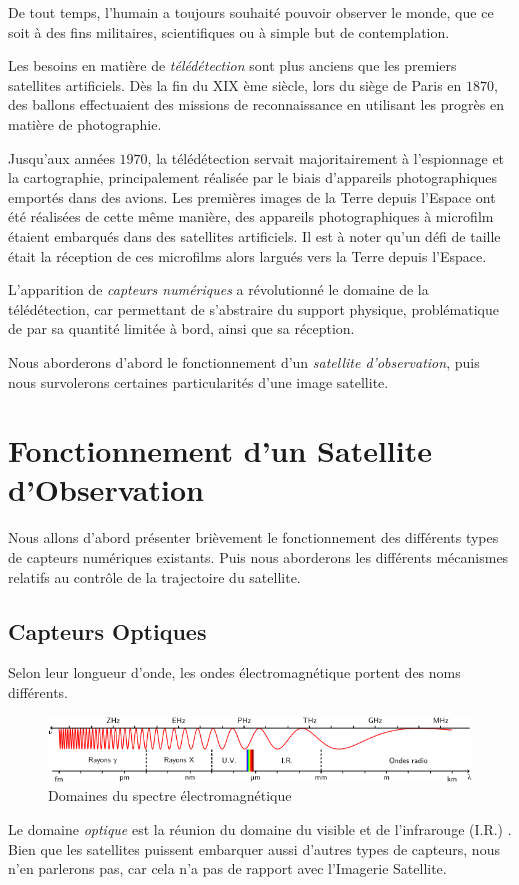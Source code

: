\documentclass[a4paper, 11pt]{report}
\begin{document}
De tout temps, l'humain a toujours souhaité pouvoir observer le monde, que ce soit à des fins militaires, scientifiques ou à simple but de contemplation.

Les besoins en matière de \emph{télédétection} sont plus anciens que les premiers satellites artificiels. Dès la fin du XIX ème siècle, lors du siège de Paris en $1870$, des ballons effectuaient des missions de reconnaissance en utilisant les progrès en matière de photographie.

Jusqu'aux années $1970$, la télédétection servait majoritairement à l'espionnage et la cartographie, principalement réalisée par le biais d'appareils photographiques emportés dans des avions.
Les premières images de la Terre depuis l'Espace ont été réalisées de cette même manière, des appareils photographiques à microfilm étaient embarqués dans des satellites artificiels. Il est à noter qu'un défi de taille était la réception de ces microfilms alors largués vers la Terre depuis l'Espace.

L'apparition de \emph{capteurs numériques} a révolutionné le domaine de la télédétection, car permettant de s'abstraire du support physique, problématique de par sa quantité limitée à bord, ainsi que sa réception.

Nous aborderons d'abord le fonctionnement d'un \emph{satellite d'observation}, puis nous survolerons certaines particularités d'une image satellite.
\section{Fonctionnement d'un Satellite d'Observation}
Nous allons d'abord présenter brièvement le fonctionnement des différents types de capteurs numériques existants.
Puis nous aborderons les différents mécanismes relatifs au contrôle de la trajectoire du satellite.
\subsection{Capteurs Optiques}
Selon leur longueur d'onde, les ondes électromagnétique portent des noms différents.
\begin{figure}[H]
	\centering
	\includegraphics[scale=0.7]{Images/Spectre_Electromagnetique.png}
	\caption{Domaines du spectre électromagnétique}
\end{figure}
Le domaine \emph{optique} est la réunion du domaine du visible et de l'infrarouge (I.R.) \citep{Wikipedia2017}.
Bien que les satellites puissent embarquer aussi d'autres types de capteurs, nous n'en parlerons pas, car cela n'a pas de rapport avec l'Imagerie Satellite.
\end{document}
